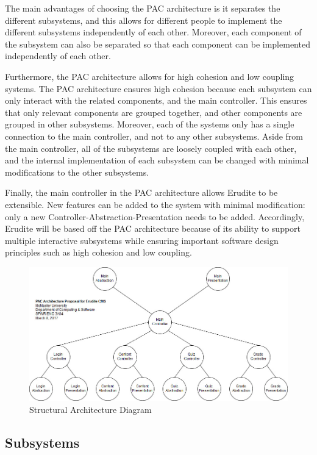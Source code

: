 \documentclass[]{article}
\begin{document}
The main advantages of choosing the PAC architecture is it separates the 
different subsystems, and this allows for different people to implement the 
different subsystems independently of each other. Moreover, each component of 
the subsystem can also be separated so that each component can be implemented 
independently of each other.

Furthermore, the PAC architecture allows for high cohesion and low coupling 
systems. The PAC architecture ensures high cohesion because each subsystem can 
only interact with the related components, and the main controller. This ensures 
that only relevant components are grouped together, and other components are 
grouped in other subsystems. Moreover, each of the systems only has a single 
connection to the main controller, and not to any other subsystems. Aside from 
the main controller, all of the subsystems are loosely coupled with each other, 
and the internal implementation of each subsystem can be changed with minimal 
modifications to the other subsystems.

Finally, the main controller in the PAC architecture allows Erudite to be 
extensible. New features can be added to the system with minimal modification: 
only a new Controller-Abstraction-Presentation needs to be added. Accordingly, 
Erudite will be based off the PAC architecture because of its ability to support 
multiple interactive subsystems while ensuring important software design 
principles such as high cohesion and low coupling.

{
  \begin{figure}[h]
  \centering
    \includegraphics[scale=0.5]{A2_Assets/Structural_Class_Diagram_v3.jpg}
  \caption{Structural Architecture Diagram}
  \end{figure}
}

\subsection{Subsystems}
\label{sub:subsystems}
\end{document}
